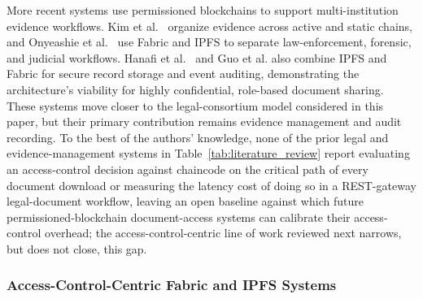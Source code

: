 \documentclass[preprint,12pt]{elsarticle}
\begin{document}
More recent systems use permissioned blockchains to support
multi-institution evidence workflows. Kim et al.~\cite{twoLevelBlockchain}
organize evidence across active and static chains, and Onyeashie
et al.~\cite{onyeashie2025fabricEvidence} use Fabric and IPFS to separate law-enforcement, forensic, and judicial workflows. Hanafi et al.~\cite{hanafi2021ipfschain} and Guo et al. \cite{guo2024efficient} also combine IPFS and Fabric for secure record storage and event auditing, demonstrating the architecture's viability for highly confidential, role-based document sharing. These systems move closer to the legal-consortium model considered in this paper, but their
primary contribution remains evidence management and audit recording. To the best of the authors' knowledge, none of the prior legal and evidence-management systems in Table~\ref{tab:literature_review} report evaluating an access-control decision against chaincode on the critical path of every document download or measuring the latency cost of doing so in a REST-gateway legal-document workflow, leaving an open baseline against which future permissioned-blockchain document-access systems can calibrate their access-control overhead; the access-control-centric line of work reviewed next narrows, but does not close, this gap.

\subsubsection{Access-Control-Centric Fabric and IPFS Systems}
\end{document}
